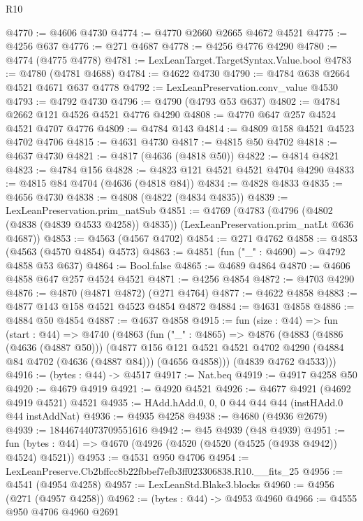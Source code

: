 \begin{lexlean}{R10}
\begin{coremodule}
@4770 := @4606 @4730
@4774 := @4770 @2660 @2665 @4672 @4521
@4775 := @4256 @637
@4776 := @271 @4687
@4778 := @4256 @4776 @4290
@4780 := @4774 (@4775 @4778)
@4781 := LexLeanTarget.TargetSyntax.Value.bool
@4783 := @4780 (@4781 @4688)
@4784 := @4622 @4730
@4790 := @4784 @638 @2664 @4521 @4671 @637 @4778
@4792 := LexLeanPreservation.conv_value @4530
@4793 := @4792 @4730
@4796 := @4790 (@4793 @53 @637)
@4802 := @4784 @2662 @121 @4526 @4521 @4776 @4290
@4808 := @4770 @647 @257 @4524 @4521 @4707 @4776
@4809 := @4784 @143
@4814 := @4809 @158 @4521 @4523 @4702 @4706
@4815 := @4631 @4730
@4817 := @4815 @50 @4702
@4818 := @4637 @4730
@4821 := @4817 (@4636 (@4818 @50))
@4822 := @4814 @4821
@4823 := @4784 @156
@4828 := @4823 @121 @4521 @4521 @4704 @4290
@4833 := @4815 @84 @4704 (@4636 (@4818 @84))
@4834 := @4828 @4833
@4835 := @4656 @4730
@4838 := @4808 (@4822 (@4834 @4835))
@4839 := LexLeanPreservation.prim_natSub
@4851 := @4769
    (@4783
      (@4796 (@4802 (@4838 (@4839 @4533 @4258)) @4835))
      (LexLeanPreservation.prim_natLt @636 @4687))
@4853 := @4563 (@4567 @4702)
@4854 := @271 @4762
@4858 := @4853 (@4563 (@4570 @4854) @4573)
@4863 := @4851 (fun ("_" : @4690) => @4792 @4858 @53 @637)
@4864 := Bool.false
@4865 := @4689 @4864
@4870 := @4606 @4858 @647 @257 @4524 @4521
@4871 := @4256 @4854
@4872 := @4703 @4290
@4876 := @4870 (@4871 @4872) (@271 @4764)
@4877 := @4622 @4858
@4883 := @4877 @143 @158 @4521 @4523 @4854 @4872
@4884 := @4631 @4858
@4886 := @4884 @50 @4854
@4887 := @4637 @4858
@4915 := fun (size : @44) =>
  fun (start : @44) =>
  @4740
    (@4863
      (fun ("_" : @4865) =>
      @4876
        (@4883
          (@4886 (@4636 (@4887 @50)))
          (@4877
            @156
            @121
            @4521
            @4521
            @4702
            @4290
            (@4884 @84 @4702 (@4636 (@4887 @84)))
            (@4656 @4858)))
        (@4839 @4762 @4533)))
@4916 := (bytes : @44) -> @4517
@4917 := Nat.beq
@4919 := @4917 @4258 @50
@4920 := @4679 @4919
@4921 := @4920 @4521
@4926 := @4677 @4921 (@4692 @4919 @4521) @4521
@4935 := HAdd.hAdd.{0, 0, 0} @44 @44 @44 (instHAdd.{0} @44 instAddNat)
@4936 := @4935 @4258
@4938 := @4680 (@4936 @2679)
@4939 := 18446744073709551616
@4942 := @45 @4939 (@48 @4939)
@4951 := fun (bytes : @44) => @4670 (@4926 (@4520 (@4520 (@4525 (@4938 @4942)) @4524) @4521))
@4953 := @4531 @950 @4706
@4954 := LexLeanPreserve.Cb2bffcc8b22fbbef7efb3ff023306838.R10.__fits_25
@4956 := @4541 (@4954 @4258)
@4957 := LexLeanStd.Blake3.blocks
@4960 := @4956 (@271 (@4957 @4258))
@4962 := (bytes : @44) -> @4953 @4960
@4966 := @4555 @950 @4706 @4960 @2691

\end{coremodule}
\end{lexlean}
